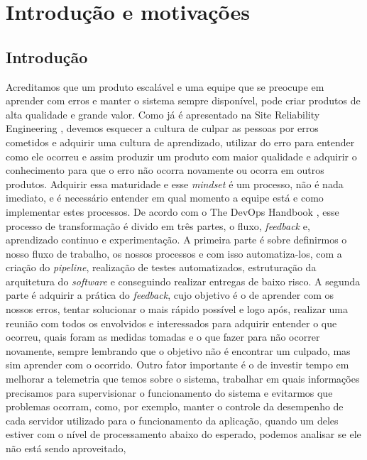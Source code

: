 \part{Introdução e motivações}
  \chapter{Introdução}
    Acreditamos que um produto escalável e uma equipe que se preocupe em aprender
    com erros e manter o sistema sempre disponível, pode criar produtos de
    alta qualidade e grande valor. \newline
    Como já é apresentado na Site Reliability Engineering \cite{SiteReliabilityEngineering},
    devemos esquecer a cultura de culpar as pessoas por erros cometidos e adquirir
    uma cultura de aprendizado, utilizar do erro para entender como ele ocorreu e
    assim produzir um produto com maior qualidade e adquirir o conhecimento para
    que o erro não ocorra novamente ou ocorra em outros produtos. Adquirir essa
    maturidade e esse \textit{mindset} é um processo, não é nada imediato, e é
    necessário entender em qual momento a equipe está e como implementar estes
    processos. \newline
    De acordo com o The DevOps Handbook \cite{TheDevOpsHandbook}, esse processo de
    transformação é divido em três partes, o fluxo, \textit{feedback} e, aprendizado
    continuo e experimentação. A primeira parte é sobre definirmos o nosso fluxo de
    trabalho, os nossos processos e com isso automatiza-los, com a criação do
    \textit{pipeline}, realização de testes automatizados, estruturação da arquitetura
    do \textit{software} e conseguindo realizar entregas de baixo risco. A segunda
    parte é adquirir a prática do \textit{feedback}, cujo objetivo é o de aprender
    com os nossos erros, tentar solucionar o mais rápido possível e logo após, realizar
    uma reunião com todos os envolvidos e interessados para adquirir entender o que
    ocorreu, quais foram as medidas tomadas e o que fazer para não ocorrer novamente,
    sempre lembrando que o objetivo não é encontrar um culpado, mas sim aprender com
    o ocorrido. Outro fator importante é o de investir tempo em melhorar a telemetria
    que temos sobre o sistema, trabalhar em quais informações precisamos para
    supervisionar o funcionamento do sistema e evitarmos que problemas ocorram,
    como, por exemplo, manter o controle da desempenho de cada servidor utilizado
    para o funcionamento da aplicação, quando um deles estiver com o nível de
    processamento abaixo do esperado, podemos analisar se ele não está sendo aproveitado,
